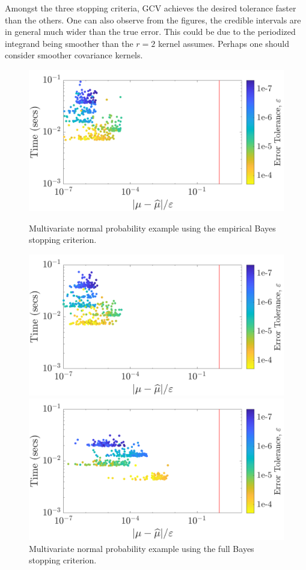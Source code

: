 \documentclass[twocolumn]{svjour3}          %
\begin{document}
Amongst the three stopping criteria, GCV achieves the desired tolerance faster than the others. 
One can also observe from the figures, the credible intervals are in general much wider than the true error.
This could be due to the periodized integrand being smoother than the $r=2$ kernel assumes. Perhaps one should consider smoother covariance kernels.

\begin{figure}
	\centering
	\includegraphics[width=0.98\linewidth]{"Lattice_MVN_guaranteed_time_MLE_C2sin_d2_r2_2019-Jun-27"}
	\caption[Guaranteed:]{Multivariate normal probability example using the empirical Bayes stopping criterion.}
	\label{fig:mvn-guaranteed-MLE}
	\centering
	\includegraphics[width=0.98\linewidth]{"Lattice_MVN_guaranteed_time_full_C2sin_d2_r2_2019-Jun-27"}
	\caption[MVN guaranteed : FB]{Multivariate normal probability example using the full Bayes stopping criterion.}
	\label{fig:mvn-guaranteed-FB}
	\centering
	\includegraphics[width=0.98\linewidth]{"Lattice_MVN_guaranteed_time_GCV_C2sin_d2_r2_2019-Jun-27"}

\end{figure}
\end{document}
